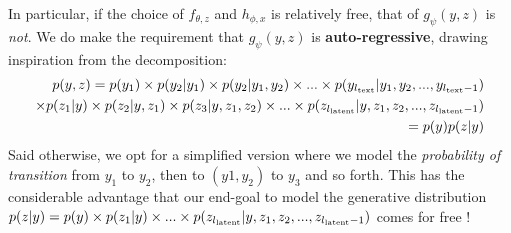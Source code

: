 \documentclass{article}
\begin{document}
\begin{appendix}
\begin{enumerate}
    In particular, if the choice of $f_{\theta,z}$ and $h_{\phi,x}$ is relatively free, that of $g_\psi(y,z)$ is \textit{not}. We do make the requirement that $g_\psi(y,z)$ is \textbf{auto-regressive}, drawing inspiration from the decomposition: \begin{equation*} \begin{split}
    p(y,z) = p(y_1) \times p(y_2|y_1) \times p(y_2|y_1,y_2) \times ... \times p(y_{{l_{\mathrm{text}}}}|y_1,y_2, ..., y_{{l_{\mathrm{text}}}-1}) \\ \times p(z_1|y) \times p(z_2|y,z_1) \times p(z_3|y,z_1,z_2) \times ... \times p(z_{{l_{\mathrm{latent}}}}|y,z_1,z_2,...,z_{{l_{\mathrm{latent}}}-1}) \\ = p(y)p(z|y) \end{split} \end{equation*}
    Said otherwise, we opt for a simplified version where we model the \textit{probability of transition} from $y_1$ to $y_2$, then to $(y1,y_2)$ to $y_3$ and so forth. This has the considerable advantage that our end-goal to model the generative distribution $p(z|y)=p(y) \times p(z_1|y) \times ... \times p(z_{{l_{\mathrm{latent}}}}|y,z_1,z_2,...,z_{{l_{\mathrm{latent}}}-1})$ comes for free !
    

\end{enumerate}
\end{appendix}
\end{document}
